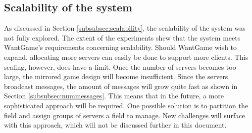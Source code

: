 	\subsection{Scalability of the system}
	\label{subsec:scalability_system_discussion}
		As discussed in Section \ref{subsubsec:scalability}, the scalability of the system was not fully explored. 
		The extent of the experiments shew that the system meets WantGame's requirements concerning scalability. 
		Should WantGame wish to expand, allocating more servers can easily be done to support more clients. 
		This scaling, however, does have a limit. Once the number of servers becomes too large, the mirrored game design will become insufficient.
		Since the servers broadcast messages, the amount of messages will grow quite fast as shown in Section \ref{subsubsec:nummessages}. This means that in the future, a more sophisticated approach will be required. 
		One possible solution is to partition the field and assign groups of servers a field to manage. 
		New challenges will surface with this approach, which will not be discussed further in this document. 